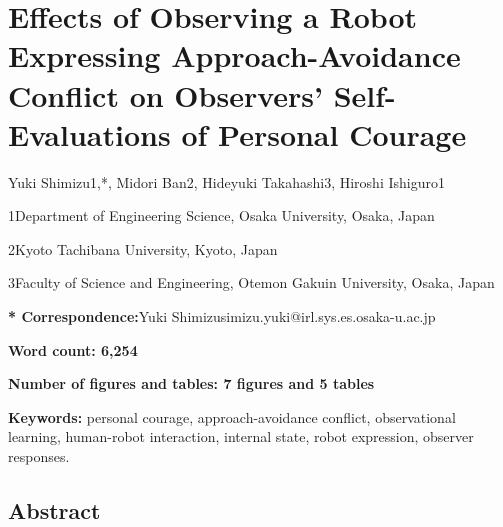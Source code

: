 \section{Effects of Observing a Robot Expressing Approach-Avoidance
Conflict on Observers' Self-Evaluations of Personal
Courage}\label{effects-of-observing-a-robot-expressing-approach-avoidance-conflict-on-observers-self-evaluations-of-personal-courage}

Yuki Shimizu1,*, Midori Ban2, Hideyuki Takahashi3, Hiroshi Ishiguro1

1Department of Engineering Science, Osaka University, Osaka, Japan

2Kyoto Tachibana University, Kyoto, Japan

3Faculty of Science and Engineering, Otemon Gakuin University, Osaka,
Japan

\textbf{* Correspondence:}Yuki
Shimizusimizu.yuki@irl.sys.es.osaka-u.ac.jp

\textbf{Word count: 6,254}

\textbf{Number of figures and tables: 7 figures and 5 tables}

\textbf{Keywords:} personal courage, approach-avoidance conflict,
observational learning, human-robot interaction, internal state, robot
expression, observer responses.

\subsection{Abstract}\label{abstract}

